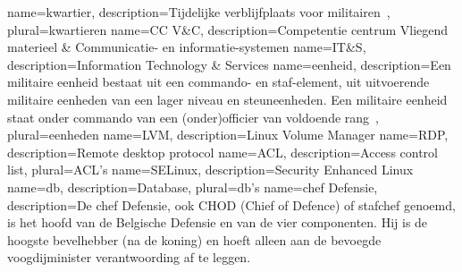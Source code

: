 {
    name=kwartier,
    description={Tijdelijke verblijfplaats voor militairen~\autocite{Wikipedia2021}},
    plural=kwartieren
}
{
    name={CC V\&C},
    description={Competentie centrum Vliegend materieel \& Communicatie- en informatie-systemen}
}
{
    name=IT\&S,
    description={Information Technology \& Services}
}
{
    name=eenheid,
    description={Een militaire eenheid bestaat uit een commando- en staf-element, uit uitvoerende militaire eenheden van een lager niveau en steuneenheden. Een militaire eenheid staat onder commando van een (onder)officier van voldoende rang~\autocite{Wikipedia2021a}},
    plural=eenheden
}
{
    name=LVM,
    description={Linux Volume Manager}
}
{
    name=RDP,
    description={Remote desktop protocol}
}
{
    name=ACL,
    description={Access control list},
    plural={ACL's}
}
{
    name=SELinux,
    description={Security Enhanced Linux}
}
{
    name=db,
    description={Database},
    plural=db's
}
{
    name=chef Defensie,
    description={De chef Defensie, ook CHOD (Chief of Defence) of stafchef genoemd, is het hoofd van de Belgische Defensie en van de vier componenten. Hij is de hoogste bevelhebber (na de koning) en hoeft alleen aan de bevoegde voogdijminister verantwoording af te leggen.~\autocite{Wikipedia2021b}}
}